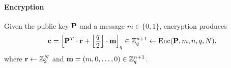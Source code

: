\documentclass[../main.tex]{subfiles}
\begin{document}
\paragraph{Encryption} Given the public key $\mathbf{P}$ and a message $m \in \{0, 1\}$, encryption produces
\begin{align*}
    \mathbf{c}=\left[{\mathbf{P}^T \cdot \mathbf{r} + \left\lfloor{\frac{q}{2}}\right\rfloor \cdot \mathbf{m}}\right]_q \in \mathbb{Z}_q^{n+1} \leftarrow \text{Enc}(\mathbf{P},m,n,q,N).
\end{align*}
where $\mathbf{r} \leftarrow \mathbb{Z}^N_2$ and $\mathbf{m}=(m, 0, \dots, 0) \in \mathbb{Z}_q^{n+1}$.
\fi 
\end{document}
